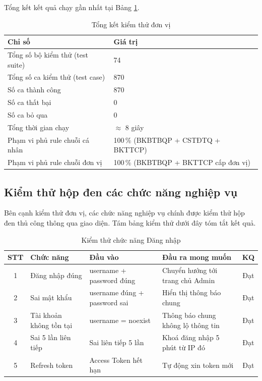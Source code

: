 \documentclass[../DoAn.tex]{subfiles}
\begin{document}
Tổng kết kết quả chạy gần nhất tại Bảng \ref{tab:tong-kiemthu}.

\begin{table}[H]
\centering
\caption{Tổng kết kiểm thử đơn vị}
\label{tab:tong-kiemthu}
\begin{tabular}{|p{8cm}|p{6cm}|}
\hline
\textbf{Chỉ số} & \textbf{Giá trị} \\ \hline
Tổng số bộ kiểm thử (test suite) & 74 \\ \hline
Tổng số ca kiểm thử (test case) & 870 \\ \hline
Số ca thành công & 870 \\ \hline
Số ca thất bại & 0 \\ \hline
Số ca bỏ qua & 0 \\ \hline
Tổng thời gian chạy & $\approx$ 8 giây \\ \hline
Phạm vi phủ rule chuỗi cá nhân & 100\,\% (BKBTBQP + CSTĐTQ + BKTTCP) \\ \hline
Phạm vi phủ rule chuỗi đơn vị & 100\,\% (BKBTBQP + BKTTCP cấp đơn vị) \\ \hline
\end{tabular}
\end{table}

\subsection{Kiểm thử hộp đen các chức năng nghiệp vụ}
\label{subsection:4.4.2}

Bên cạnh kiểm thử đơn vị, các chức năng nghiệp vụ chính được kiểm thử hộp đen thủ công thông qua giao diện. Tám bảng kiểm thử dưới đây tóm tắt kết quả.

\begin{table}[H]
\centering
\caption{Kiểm thử chức năng Đăng nhập}
\label{tab:kt-dangnhap}
\begin{tabular}{|c|p{4cm}|p{3.5cm}|p{4cm}|c|}
\hline
\textbf{STT} & \textbf{Chức năng} & \textbf{Đầu vào} & \textbf{Đầu ra mong muốn} & \textbf{KQ} \\ \hline
1 & Đăng nhập đúng & username + password đúng & Chuyển hướng tới trang chủ Admin & Đạt \\ \hline
2 & Sai mật khẩu & username đúng + password sai & Hiển thị thông báo chung & Đạt \\ \hline
3 & Tài khoản không tồn tại & username = noexist & Thông báo chung không lộ thông tin & Đạt \\ \hline
4 & Sai 5 lần liên tiếp & Sai liên tiếp 5 lần & Khoá đăng nhập 5 phút từ IP đó & Đạt \\ \hline
5 & Refresh token & Access Token hết hạn & Tự động xin token mới & Đạt \\ \hline
\end{tabular}
\end{table}
\end{document}
